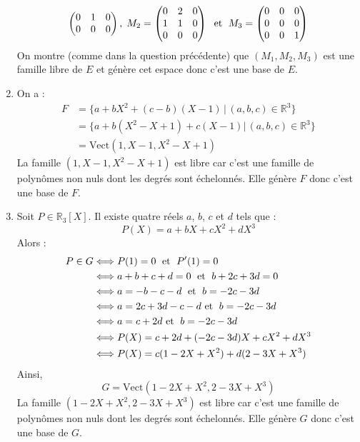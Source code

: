 \documentclass[a4paper,10pt]{report}
\begin{document}
\begin{enumerate}
$$\begin{pmatrix}
0 & 1 & 0 \\
0 & 0 & 0
\end{pmatrix}, \; M_2 = \begin{pmatrix}
0 & 2 & 0 \\
1 & 1& 0 \\
0 & 0 & 0
\end{pmatrix} \; \hbox{ et } \; M_3 = \begin{pmatrix}
0 & 0 & 0 \\
0 & 0& 0 \\
0 & 0 & 1
\end{pmatrix}$$
On montre (comme dans la question précédente) que $(M_1,M_2,M_3)$ est une famille libre de $E$ et génère cet espace donc c'est une base de $E$.
\item On a :
\begin{align*}
F & = \lbrace a + bX^2 + (c-b)(X-1) \, \vert \, (a,b,c) \in \mathbb{R}^3 \rbrace \\
& = \lbrace a + b(X^2-X+1)+ c (X-1) \vert \, (a,b,c) \in \mathbb{R}^3 \rbrace \\ 
& = \textrm{Vect}(1,X-1,X^2-X+1)
\end{align*}
La famille $(1,X-1,X^2-X+1)$ est libre car c'est une famille de polynômes non nuls dont les degrés sont échelonnés. Elle génère $F$ donc c'est une base de $F$.
\item Soit $P \in \mathbb{R}_3[X]$. Il existe quatre réels $a$, $b$, $c$ et $d$ tels que :
$$ P(X) = a +bX+cX^2+dX^3$$
Alors :
\begin{align*}
P \in G & \Longleftrightarrow P(1)=0 \; \hbox{ et } \; P'(1)=0 \\
& \Longleftrightarrow a+b+c+d = 0 \; \hbox{ et } \; b+2c+3d = 0 \\
& \Longleftrightarrow a=-b-c-d \; \hbox{ et } \; b=-2c-3d \\
& \Longleftrightarrow a = 2c+3d-c-d  \hbox{ et } \; b=-2c-3d \\
& \Longleftrightarrow a = c +2d \hbox{ et } \; b=-2c-3d \\
& \Longleftrightarrow P(X) = c+2d + (-2c-3d)X + c X^2 + dX^3 \\
& \Longleftrightarrow P(X) = c (1-2X+X^2)+ d (2-3X+X^3)
\end{align*}
Ainsi,
$$ G = \textrm{Vect}(1-2X+X^2,2-3X+X^3)$$
La famille $(1-2X+X^2,2-3X+X^3)$ est libre car c'est une famille de polynômes non nuls dont les degrés sont échelonnés. Elle génère $G$ donc c'est une base de $G$.
\end{enumerate}
\end{document}
